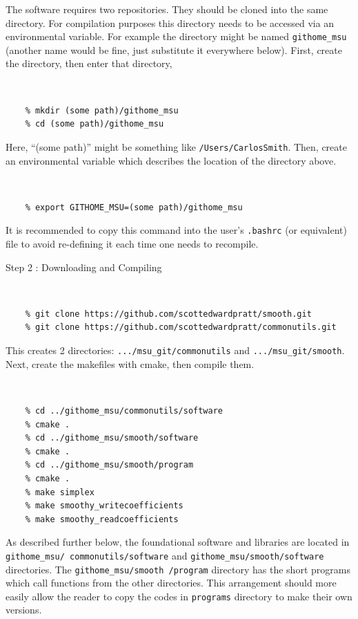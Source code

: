 \documentclass[12pt]{article}
\numberwithin{equation}{section}
\numberwithin{figure}{section}
\begin{document}
The software requires two repositories. They should be cloned into the same directory. For compilation purposes this directory needs to be accessed via an environmental variable.  For example the directory might be named {\tt githome\_msu} (another name would be fine, just substitute it everywhere below). First, create the directory, then enter that directory,\\
\vspace{-20pt}
{\tt 
\begin{verbatim}
    % mkdir (some path)/githome_msu
    % cd (some path)/githome_msu
\end{verbatim}
}
Here, ``(some path)'' might be something like {\tt /Users/CarlosSmith}. Then, create an environmental variable which describes the location of the directory above.\\
\vspace{-20pt}
{\tt 
\begin{verbatim}
    % export GITHOME_MSU=(some path)/githome_msu
\end{verbatim}
}
It is recommended to copy this command into the user's {\tt .bashrc} (or equivalent) file to avoid re-defining it each time one needs to recompile.

\begin{description}
\item[Step 2 : Downloading and Compiling]\label{sec:Downloading and Compiling}
\end{description}
\vspace{-20pt}
{\tt 
\begin{verbatim}
    % git clone https://github.com/scottedwardpratt/smooth.git
    % git clone https://github.com/scottedwardpratt/commonutils.git
\end{verbatim}
}

This creates 2 directories: {\tt .../msu\_git/commonutils} and {\tt .../msu\_git/smooth}. Next, create the makefiles with cmake, then compile them.\\
\vspace{-20pt}
{\tt 
\begin{verbatim}
    % cd ../githome_msu/commonutils/software
    % cmake .
    % cd ../githome_msu/smooth/software
    % cmake .
    % cd ../githome_msu/smooth/program
    % cmake .
    % make simplex
    % make smoothy_writecoefficients
    % make smoothy_readcoefficients
\end{verbatim}
}
As described further below, the foundational software and libraries are located in {\tt githome\_msu/ commonutils/software} and {\tt githome\_msu/smooth/software} directories. The {\tt githome\_msu/smooth /program} directory has the short programs which call functions from the other directories. This arrangement should more easily allow the reader to copy the codes in {\tt programs} directory to make their own versions.
\end{document}
